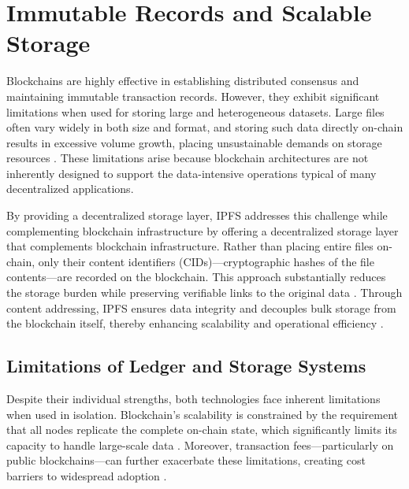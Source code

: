 \documentclass[final]{rc-book-2.14}
\begin{document}
\section{Immutable Records and Scalable Storage}
\label{chp:background:sec:ipfs_bct_comp}

Blockchains are highly effective in establishing distributed consensus and maintaining immutable transaction records. However, they exhibit significant limitations when used for storing large and heterogeneous datasets. Large files often vary widely in both size and format, and storing such data directly on-chain results in excessive volume growth, placing unsustainable demands on storage resources \cite{miller2016scaling, xu2018survey}. These limitations arise because blockchain architectures are not inherently designed to support the data-intensive operations typical of many decentralized applications.

By providing a decentralized storage layer, IPFS addresses this challenge while complementing blockchain infrastructure by offering a decentralized storage layer that complements blockchain infrastructure. Rather than placing entire files on-chain, only their content identifiers (CIDs)—cryptographic hashes of the file contents—are recorded on the blockchain. This approach substantially reduces the storage burden while preserving verifiable links to the original data \cite{benet2014ipfs, wood2014ethereum}. Through content addressing, IPFS ensures data integrity and decouples bulk storage from the blockchain itself, thereby enhancing scalability and operational efficiency \cite{zhang2020decentralized}.


\subsection{Limitations of Ledger and Storage Systems}

Despite their individual strengths, both technologies face inherent limitations when used in isolation. Blockchain's scalability is constrained by the requirement that all nodes replicate the complete on-chain state, which significantly limits its capacity to handle large-scale data \cite{steichen2018}. Moreover, transaction fees—particularly on public blockchains—can further exacerbate these limitations, creating cost barriers to widespread adoption \cite{easley_mining_2019}.
\end{document}
